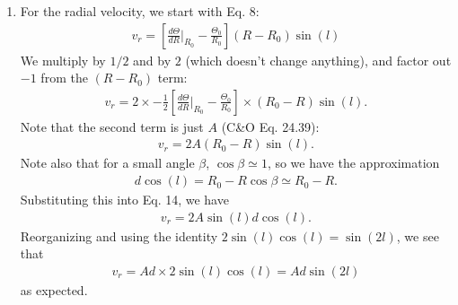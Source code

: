 \documentclass[11pt,letterpaper]{article}
\begin{document}
\begin{enumerate}[label=(\alph*)]
    \item For the radial velocity, we start with Eq. 8:
        \begin{align}
            v_r = \left[\frac{d\Theta}{dR}\Big|_{R_0} - \frac{\Theta_0}{R_0}\right](R-R_0)\sin(l)
        \end{align}
        We multiply by $1/2$ and by $2$ (which doesn't change anything), and factor out $-1$ from the $(R-R_0)$ term:
        \begin{align}
            v_r = 2\times -\frac{1}{2}\left[\frac{d\Theta}{dR}\Big|_{R_0} - \frac{\Theta_0}{R_0}\right]\times(R_0-R)\sin(l).
        \end{align}
        Note that the second term is just $A$ (C&O Eq. 24.39):
        \begin{align}
            v_r = 2A(R_0-R)\sin(l).
        \end{align}
        Note also that for a small angle $\beta$, $\cos\beta \simeq 1$, so we have the approximation 
        \begin{align}
            d\cos(l) = R_0 - R\cos\beta \simeq R_0 - R.
        \end{align}
        Substituting this into Eq. 14, we have 
        \begin{align}
            v_r = 2A\sin(l)d\cos(l).
        \end{align}
        Reorganizing and using the identity $2\sin(l)\cos(l) = \sin(2l)$, we see that 
        \begin{align*}
            v_r = Ad\times 2\sin(l)\cos(l) = Ad\sin(2l)
        \end{align*}
        as expected.


\end{enumerate}
\end{document}
